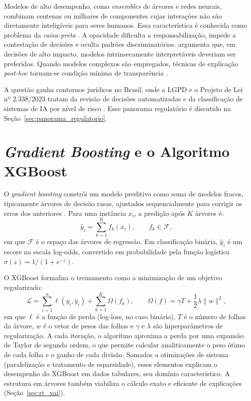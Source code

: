 Modelos de alto desempenho, como \textit{ensembles} de árvores e redes neurais, combinam centenas ou milhares de componentes cujas interações não são diretamente inteligíveis para seres humanos. Essa característica é conhecida como problema da \textit{caixa-preta} \cite{adadi2018peeking}. A opacidade dificulta a responsabilização, impede a contestação de decisões e oculta padrões discriminatórios.  argumenta que, em decisões de alto impacto, modelos intrinsecamente interpretáveis deveriam ser preferidos. Quando modelos complexos são empregados, técnicas de explicação \textit{post-hoc} tornam-se condição mínima de transparência \cite{arrieta2020explainable}.

A questão ganha contornos jurídicos no Brasil, onde a LGPD e o Projeto de Lei nº 2.338/2023 tratam da revisão de decisões automatizadas e da classificação de sistemas de IA por nível de risco \cite{brasil2018lgpd, brasil2023pl2338}. Esse panorama regulatório é discutido na Seção~\ref{sec:panorama_regulatorio}.

\section{\textit{Gradient Boosting} e o Algoritmo XGBoost}
\label{sec:rt_xgboost}

O \textit{gradient boosting} constrói um modelo preditivo como soma de modelos fracos, tipicamente árvores de decisão rasas, ajustados sequencialmente para corrigir os erros dos anteriores \cite{friedman2001greedy, hastie2009elements}. Para uma instância $x_i$, a predição após $K$ árvores é:
\begin{equation}
\hat{y}_i = \sum_{k=1}^{K} f_k(x_i), \qquad f_k \in \mathcal{F},
\label{eq:rt_boosting}
\end{equation}
em que $\mathcal{F}$ é o espaço das árvores de regressão. Em classificação binária, $\hat{y}_i$ é um escore na escala log-odds, convertido em probabilidade pela função logística $\sigma(z) = 1/(1+e^{-z})$.

O XGBoost \cite{chen2016xgboost} formaliza o treinamento como a minimização de um objetivo regularizado:
\begin{equation}
\mathcal{L} = \sum_{i=1}^{n} \ell(y_i, \hat{y}_i) + \sum_{k=1}^{K} \Omega(f_k), \qquad \Omega(f) = \gamma T + \frac{1}{2}\lambda \lVert w \rVert^2,
\label{eq:rt_xgb_obj}
\end{equation}
em que $\ell$ é a função de perda (log-loss, no caso binário), $T$ é o número de folhas da árvore, $w$ é o vetor de pesos das folhas e $\gamma$ e $\lambda$ são hiperparâmetros de regularização. A cada iteração, o algoritmo aproxima a perda por uma expansão de Taylor de segunda ordem, o que permite calcular analiticamente o peso ótimo de cada folha e o ganho de cada divisão. Somados a otimizações de sistema (paralelização e tratamento de esparsidade), esses elementos explicam o desempenho do XGBoost em dados tabulares, seu domínio característico. A estrutura em árvores também viabiliza o cálculo exato e eficiente de explicações (Seção~\ref{sec:rt_xai}).

